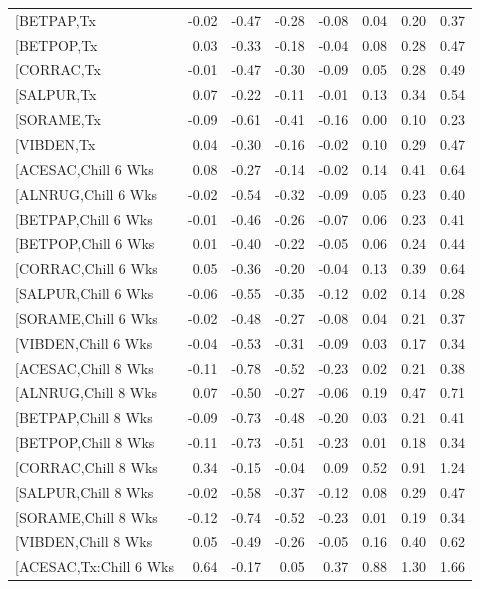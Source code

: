 \documentclass{article}\usepackage[]{graphicx}\usepackage[]{color}
\begin{document}
\begin{longtable}{lrrrrrrr}
  [BETPAP,Tx & -0.02 & -0.47 & -0.28 & -0.08 & 0.04 & 0.20 & 0.37 \\ 
  [BETPOP,Tx & 0.03 & -0.33 & -0.18 & -0.04 & 0.08 & 0.28 & 0.47 \\ 
  [CORRAC,Tx & -0.01 & -0.47 & -0.30 & -0.09 & 0.05 & 0.28 & 0.49 \\ 
  [SALPUR,Tx & 0.07 & -0.22 & -0.11 & -0.01 & 0.13 & 0.34 & 0.54 \\ 
  [SORAME,Tx & -0.09 & -0.61 & -0.41 & -0.16 & 0.00 & 0.10 & 0.23 \\ 
  [VIBDEN,Tx & 0.04 & -0.30 & -0.16 & -0.02 & 0.10 & 0.29 & 0.47 \\ 
  [ACESAC,Chill 6 Wks & 0.08 & -0.27 & -0.14 & -0.02 & 0.14 & 0.41 & 0.64 \\ 
  [ALNRUG,Chill 6 Wks & -0.02 & -0.54 & -0.32 & -0.09 & 0.05 & 0.23 & 0.40 \\ 
  [BETPAP,Chill 6 Wks & -0.01 & -0.46 & -0.26 & -0.07 & 0.06 & 0.23 & 0.41 \\ 
  [BETPOP,Chill 6 Wks & 0.01 & -0.40 & -0.22 & -0.05 & 0.06 & 0.24 & 0.44 \\ 
  [CORRAC,Chill 6 Wks & 0.05 & -0.36 & -0.20 & -0.04 & 0.13 & 0.39 & 0.64 \\ 
  [SALPUR,Chill 6 Wks & -0.06 & -0.55 & -0.35 & -0.12 & 0.02 & 0.14 & 0.28 \\ 
  [SORAME,Chill 6 Wks & -0.02 & -0.48 & -0.27 & -0.08 & 0.04 & 0.21 & 0.37 \\ 
  [VIBDEN,Chill 6 Wks & -0.04 & -0.53 & -0.31 & -0.09 & 0.03 & 0.17 & 0.34 \\ 
  [ACESAC,Chill 8 Wks & -0.11 & -0.78 & -0.52 & -0.23 & 0.02 & 0.21 & 0.38 \\ 
  [ALNRUG,Chill 8 Wks & 0.07 & -0.50 & -0.27 & -0.06 & 0.19 & 0.47 & 0.71 \\ 
  [BETPAP,Chill 8 Wks & -0.09 & -0.73 & -0.48 & -0.20 & 0.03 & 0.21 & 0.41 \\ 
  [BETPOP,Chill 8 Wks & -0.11 & -0.73 & -0.51 & -0.23 & 0.01 & 0.18 & 0.34 \\ 
  [CORRAC,Chill 8 Wks & 0.34 & -0.15 & -0.04 & 0.09 & 0.52 & 0.91 & 1.24 \\ 
  [SALPUR,Chill 8 Wks & -0.02 & -0.58 & -0.37 & -0.12 & 0.08 & 0.29 & 0.47 \\ 
  [SORAME,Chill 8 Wks & -0.12 & -0.74 & -0.52 & -0.23 & 0.01 & 0.19 & 0.34 \\ 
  [VIBDEN,Chill 8 Wks & 0.05 & -0.49 & -0.26 & -0.05 & 0.16 & 0.40 & 0.62 \\ 
  [ACESAC,Tx:Chill 6 Wks & 0.64 & -0.17 & 0.05 & 0.37 & 0.88 & 1.30 & 1.66 \\ 

\end{longtable}
\end{document}
